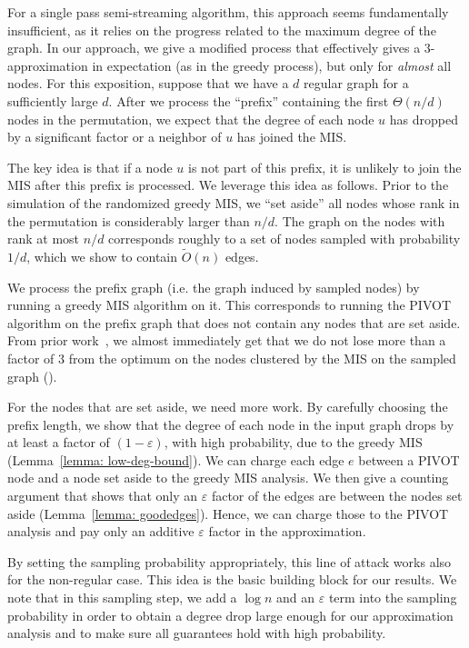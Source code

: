 \documentclass{theoretics}
\newcommand{\pivot}{\textrm{PIVOT}\xspace}
\newcommand{\eps}{\ensuremath{\varepsilon}}
\begin{document}
For a single pass semi-streaming algorithm, this approach seems fundamentally insufficient, as it relies on the progress related to the maximum degree of the graph. In our approach, we give a modified process that effectively gives a $3$-approximation in expectation (as in the greedy process), but only for \emph{almost} all nodes.
For this exposition, suppose that we have a $d$ regular graph for a sufficiently large $d$.
After we process the ``prefix'' containing the first $\Theta(n/d)$ nodes in the permutation, we expect that the degree of each node $u$ has dropped by a significant factor or a neighbor of $u$ has joined the MIS.

The key idea is that if a node $u$ is not part of this prefix, it is unlikely to join the MIS after this prefix is processed.
We leverage this idea as follows.
Prior to the simulation of the randomized greedy MIS, we ``set aside'' all nodes whose rank in the permutation is considerably larger than $n/d$.
The graph on the nodes with rank at most $n/d$ corresponds roughly to a set of nodes sampled with probability $1 / d$, which we show to contain $\widetilde{O}(n)$ edges. 

We process the prefix graph (i.e. the graph induced by sampled nodes) by running a greedy MIS algorithm on it.
This corresponds to running the \pivot algorithm on the prefix graph that does not contain any nodes that are set aside.
From prior work~\cite{ailon2008aggregating}, we almost immediately get that we do not lose more than a factor of $3$ from the optimum on the nodes clustered by the MIS on the sampled graph ().


For the nodes that are set aside, we need more work. By carefully choosing the prefix length, we show that the degree of each node in the input graph drops by at least a factor of $(1 - \eps)$, with high probability, due to the greedy MIS (Lemma~\ref{lemma: low-deg-bound}).
We can charge each edge $e$ between a \pivot node and a node set aside to the greedy MIS analysis.
We then give a counting argument that shows that only an $\eps$ factor of the edges are between the nodes set aside (Lemma~\ref{lemma: goodedges}).
Hence, we can charge those to the \pivot analysis and pay only an additive $\eps$ factor in the approximation.

By setting the sampling probability appropriately, this line of attack works also for the non-regular case.
This idea is the basic building block for our results.
We note that in this sampling step, we add a $\log n$ and an $\eps$ term into the sampling probability in order to obtain a degree drop large enough for our approximation analysis and to make sure all guarantees hold with high probability.
\end{document}
